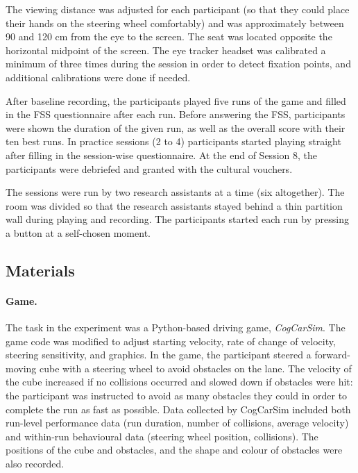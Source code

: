\documentclass[fleqn,10pt]{wlscirep}
\begin{document}
The viewing distance was adjusted for each participant (so that they could place their hands on the steering wheel comfortably) and was approximately between 90 and 120 cm from the eye to the screen. The seat was located opposite the horizontal midpoint of the screen. The eye tracker headset was calibrated a minimum of three times during the session in order to detect fixation points, and additional calibrations were done if needed.

After baseline recording, the participants played five runs of the game and filled in the FSS questionnaire after each run. Before answering the FSS, participants were shown the duration of the given run, as well as the overall score with their ten best runs. In practice sessions (2 to 4) participants started playing straight after filling in the session-wise questionnaire. At the end of Session 8, the participants were debriefed and granted with the cultural vouchers.

The sessions were run by two research assistants at a time (six altogether). The room was divided so that the research assistants stayed behind a thin partition wall during playing and recording. The participants started each run by pressing a button at a self-chosen moment.

\subsection*{Materials}
\paragraph{Game.} The task in the experiment was a Python-based driving game, {\it CogCarSim}. The game code was modified to adjust starting velocity, rate of change of velocity, steering sensitivity, and graphics. In the game, the participant steered a forward-moving cube with a steering wheel to avoid obstacles on the lane. The velocity of the cube increased if no collisions occurred and slowed down if obstacles were hit: the participant was instructed to avoid as many obstacles they could in order to complete the run as fast as possible.
Data collected by CogCarSim included both run-level performance data (run duration, number of collisions, average velocity) and within-run behavioural data (steering wheel position, collisions). The positions of the cube and obstacles, and the shape and colour of obstacles were also recorded.
\end{document}
